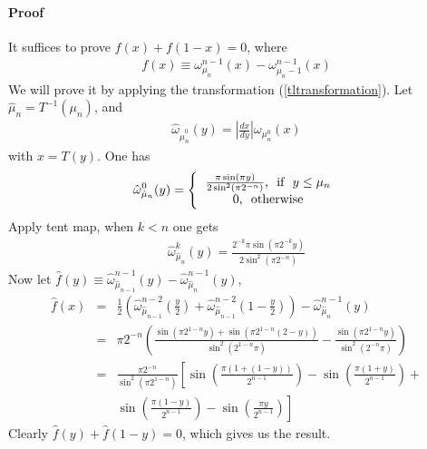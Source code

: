 \paragraph{Proof}
It suffices to prove $f(x)+ f(1-x) = 0$, where 
  \begin{eqnarray}
     f(x) \equiv \omega_{\mu_n}^{n-1}(x) -\omega_{\mu_n-1}^{n-1}(x)
  \end{eqnarray}
We will prove it by applying the transformation (\ref{tltransformation}). Let $\hat{\mu}_n = T^{-1}(\mu_n)$, and 
 \begin{eqnarray}
    \hat{\omega}_{\hat{\mu}_n^0}(y) = \left|\frac{dx}{dy}\right| \omega_{\mu_n^0}(x)   
 \end{eqnarray}
with $x = T(y)$. One has
 \begin{eqnarray}
 \label{omegamunbar0}
    \hat{\omega}_{\hat{\mu}_n}^0(y) = \left\{ \begin{tabular}{c}
                      $\frac{\pi \sin(\pi y)}{2 \sin^2(\pi 2^{-n})} $, \mbox{  if  } $y \le \mu_n$ \nonumber\\ 
                      $0$, \mbox{  otherwise} 
                      \end{tabular}\right.
  \end{eqnarray}
Apply tent map, when $k<n$ one gets
 \begin{eqnarray}
   \hat{\omega}_{\hat{\mu}_n}^k(y)  = \frac{ 2^{-k} \pi \sin(\pi 2^{-k}y)}{2 \sin^2(\pi 2^{-n})}
 \end{eqnarray}
Now let $\hat{f}(y) \equiv \hat{\omega}_{\hat{\mu}_{n-1}}^{n-1}(y) -\hat{\omega}_{\hat{\mu}_n}^{n-1}(y)$,
 \begin{eqnarray}
  \hat{f}(x)  &=&  \frac{1}{2} \left(  \hat{\omega}_{\hat{\mu}_{n-1}}^{n-2}\left(\frac{y}{2}\right) +
                                     \hat{\omega}_{\hat{\mu}_{n-1}}^{n-2}\left(1-\frac{y}{2}\right)  \right) 
                                    -\hat{\omega}_{\hat{\mu}_n}^{n-1}(y) \nonumber\\
              &=& \pi 2^{-n} \left( \frac{\sin(\pi 2^{1-n}y)+\sin(\pi 2^{1-n}(2-y))}{\sin^2(2^{1-n}\pi)} 
                                    -\frac{\sin(\pi 2^{1-n}y)}{\sin^2(2^{-n}\pi)}
                                     \right) \nonumber\\
              &=& \frac{\pi 2^{-n}}{\sin^2(\pi 2^{1-n})} \left[ 
                                     \sin \left(\frac{\pi(1+(1-y))}{2^{n-1}}\right)  
                                    -\sin \left(\frac{\pi(1+y)}{2^{n-1}} \right) + \right. \nonumber\\
              & &             \left. \sin \left(\frac{\pi(1-y)}{2^{n-1}}\right) 
                                    -\sin \left(\frac{\pi y }{2^{n-1}}\right)
                                                          \right]
 \end{eqnarray}
Clearly $\hat{f}(y) + \hat{f}(1-y) = 0$, which gives us the result.














